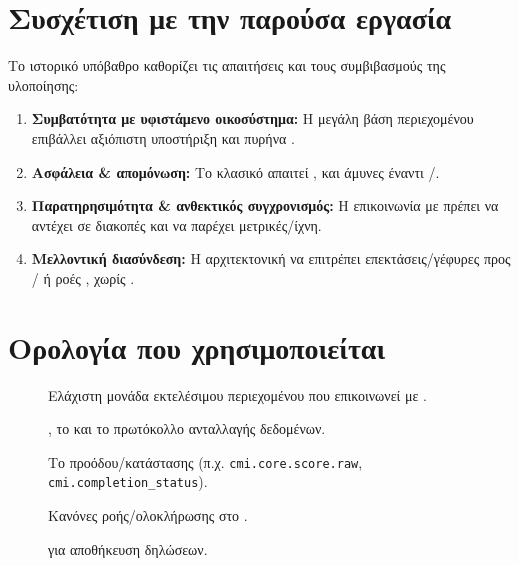 \section{Συσχέτιση με την παρούσα εργασία}\label{sec:history-relation}
Το ιστορικό υπόβαθρο καθορίζει τις απαιτήσεις και τους συμβιβασμούς της υλοποίησης:
\begin{enumerate}
  \item \textbf{Συμβατότητα με υφιστάμενο οικοσύστημα:} Η μεγάλη βάση  περιεχομένου επιβάλλει αξιόπιστη υποστήριξη  και πυρήνα .
  \item \textbf{Ασφάλεια \& απομόνωση:} Το κλασικό  απαιτεί ,  και άμυνες έναντι /.
  \item \textbf{Παρατηρησιμότητα \& ανθεκτικός συγχρονισμός:} Η επικοινωνία με  πρέπει να αντέχει σε διακοπές και να παρέχει μετρικές/ίχνη.
  \item \textbf{Μελλοντική διασύνδεση:} Η αρχιτεκτονική να επιτρέπει επεκτάσεις/γέφυρες προς / ή ροές , χωρίς \textit{}.
\end{enumerate}

\section{Ορολογία που χρησιμοποιείται}
\begin{description}
  \item[] Ελάχιστη μονάδα εκτελέσιμου  περιεχομένου που επικοινωνεί με .
  \item[] , το  και το πρωτόκολλο ανταλλαγής δεδομένων.
  \item[] Το  προόδου/κατάστασης (π.χ. \texttt{cmi.core.score.raw}, \texttt{cmi.completion\_status}).
  \item[] Κανόνες ροής/ολοκλήρωσης στο .
  \item[]  για αποθήκευση  δηλώσεων.
\end{description}
